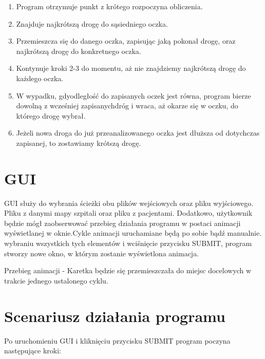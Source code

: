 ﻿\documentclass{article}
\begin{document}
\begin{enumerate}

\item Program otrzymuje punkt z kr\'{o}tego rozpoczyna obliczenia.
\item Znajduje najkr\'{o}tsz\k{a} drog\k{e} do s\k{a}siedniego oczka.
\item Przemieszcza si\k{e} do danego oczka, zapisuj\k{a}c jak\k{a} pokona{\l} drog\k{e}, oraz najkr\'{o}tsz\k{a} drog\k{e} do konkretnego oczka.
\item Kontynuje kroki 2-3 do momentu, a\.{z} nie znajdziemy najkr\'{o}tsz\k{a} drog\k{e} do ka\.{z}dego oczka.
\item W wypadku, gdyodleg{\l}o\'{s}\'{c} do zapisanych oczek jest r\'{o}wna, program bierze dowoln\k{a} z wcze\'{s}niej zapisanychdr\'{o}g i wraca, a\.{z} okarze si\k{e} w oczku, do kt\'{o}rego drog\k{e} wybra{\l}.
\item Je\.{z}eli nowa droga do ju\.{z} przeanalizowanego oczka jest d{\l}u\.{z}sza od dotychczas zapisanej, to zostawiamy kr\'{o}tsz\k{a} drog\k{e}.
\end{enumerate}

\section{GUI}

\noindent GUI s{\l}u\.{z}y do wybrania \'{s}cie\.{z}ki obu plik\'{o}w wej\'{s}ciowych oraz pliku wyj\'{s}ciowego. Pliku z danymi mapy szpitali oraz pliku z pacjentami. Dodatkowo, u\.{z}ytkownik b\k{e}dzie m\'{o}g{\l} zaobserwowa\'{c} przebieg dzia{\l}ania programu w postaci animacji wy\'{s}wietlanej w oknie.Cykle animacji uruchamiane b\k{e}d\k{a} po sobie b\k{a}d\'{z} manualnie. wybraniu wszystkich tych element\'{o}w i wci\'{s}ni\k{e}cie przycisku SUBMIT, program stworzy nowe okno, w kt\'{o}rym zostanie wy\'{s}wietlona animacja.

\noindent Przebieg animacji - Karetka b\k{e}dzie si\k{e} przemieszcza{\l}a do miejsc docelowych w trakcie jednego ustalonego cyklu.

\noindent 
\section{Scenariusz dzia{\l}ania programu}

\noindent Po uruchomieniu GUI i klikni\k{e}ciu przycisku SUBMIT program poczyna nast\k{e}puj\k{a}ce kroki:
\end{document}

